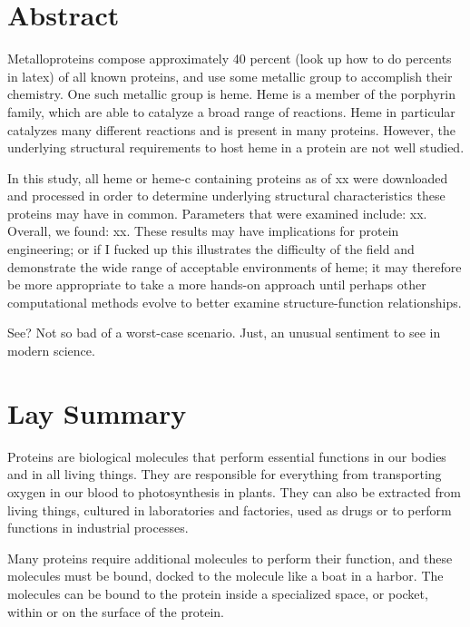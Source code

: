 \documentclass[12pt,oneside,a4paper]{report}
\begin{document}
	
	
	\chapter*{Abstract}
	
	
		Metalloproteins compose approximately 40 percent (look up how to do percents in latex) of all known proteins, and use some metallic group to accomplish their chemistry. One such metallic group is heme. Heme is a member of the porphyrin family, which are able to catalyze a broad range of reactions. Heme in particular catalyzes many different reactions and is present in many proteins. However, the underlying structural requirements to host heme in a protein are not well studied.
		
		In this study, all heme or heme-c containing proteins as of xx were downloaded and processed in order to determine underlying structural characteristics these proteins may have in common. Parameters that were examined include: xx. Overall, we found: xx. These results may have implications for protein engineering; or if I fucked up this illustrates the difficulty of the field and demonstrate the wide range of acceptable environments of heme; it may therefore be more appropriate to take a more hands-on approach until perhaps other computational methods evolve to better examine structure-function relationships.
		
		See? Not so bad of a worst-case scenario. Just, an unusual sentiment to see in modern science.
		
	
	\chapter*{Lay Summary}
		
		Proteins are biological molecules that perform essential functions in our bodies and in all living things. They are responsible for everything from transporting oxygen in our blood to photosynthesis in plants. They can also be extracted from living things, cultured in laboratories and factories, used as drugs or to perform functions in industrial processes.
		
		Many proteins require additional molecules to perform their function, and these molecules must be bound, docked to the molecule like a boat in a harbor. The molecules can be bound to the protein inside a specialized space, or pocket, within or on the surface of the protein.
		
\end{document}
